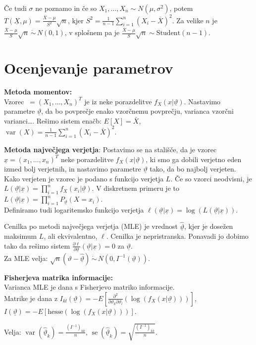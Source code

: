 \documentclass[11pt,a4paper]{amsart}
\theoremstyle{definition} %
\theoremstyle{plain} %
\newcommand{\X}{\underline{X}}
\newcommand{\ux}{\underline{x}}
\newcommand{\utheta}{\underline{\vartheta}}
\DeclareMathOperator{\var}{var}
\DeclareMathOperator{\se}{se}
\begin{document}
Če tudi $\sigma$ ne poznamo in če so $X_1,\ldots, X_n \sim N(\mu, \sigma^2)$,
potem $T(\X ,\mu) = \frac{\overline{X} - \mu}{S^2}\sqrt{n}$, kjer $S^2 =
\frac{1}{n-1} \sum_{i=1}^n (X_i - \overline{X})^2$. Za velike $n$ je $
\frac{\overline{X} - \mu}{S}\sqrt{n} \,\dot{\sim}\, N(0,1)$, v splošnem pa je $
\frac{\overline{X} - \mu}{S}\sqrt{n} \sim \text{Student}(n-1).$

\section*{Ocenjevanje parametrov}
\textbf{Metoda momentov:} \\
Vzorec $\ = (X_1, \dots, X_n)^T$ je iz neke porazdelitve $f_X(x|\utheta)$.
Nastavimo parametre $\utheta$, da bo povprečje enako vzorčnemu povprečju,
varianca vzorčni varianci\dots. Rešimo sistem enačb: $E[X] = \bar{X}$, $\var(X)
= \frac{1}{n-1}\sum_{i=1}^n (X_i - \bar{X})^2$.

\textbf{Metoda največjega verjetja}: Postavimo se na stališče, da je vzorec
$\ux = (x_1, \dots, x_n)^T$ neke porazdelitve
$f_X(x|\utheta)$, ki smo ga dobili verjetno eden izmed bolj verjetnih,
in nastavimo parametre $\utheta$ tako, da bo najbolj verjeten.
Kako verjeten je vzorec je podano s funkcijo verjetja $L$.
Če so vzorci neodvisni, je $L(\utheta|\ux) = \prod_{i=1}^n f_X(x_i|\utheta)$. V
diskretnem primeru je to $L(\utheta|\ux) = \prod_{i=1}^n P_{\utheta}(X=x_i)$. \\
Definiramo tudi logaritemsko funkcijo verjetja $\ell(\utheta|\ux) =
\log(L(\utheta|\ux))$.

Cenilka po metodi največjega verjetja (MLE) je vrednost $\hat{\utheta}$, kjer je
dosežen maksimum $L$, ali ekvivalentno, $\ell$. Cenilka je nepristranska.
Ponavadi jo dobimo tako da rešimo sistem $\frac{\partial \ell}{\partial
\utheta}(\utheta|\ux) = 0$ za $\utheta$. \\
Za MLE velja: $\sqrt{n}(\vartheta - \hat{\utheta}) \,\dot{\sim}\, N(0, I^{-1}(\utheta))$.

\textbf{Fisherjeva matrika informacije:} \\
Varianca MLE je dana s Fisherjevo matriko informacije. \\
Matrike je dana z $I_{kl}(\utheta) = -E\left[\frac{\partial^2}{\partial
\vartheta_k\partial\vartheta_l}(\log(f_X(x|\utheta)))\right]$, $I(\utheta) = -E[\text{hesse}(\log(f_X(x|\utheta)))]$.

Velja: $\var(\hat{\utheta}_k) = \frac{(I^{-1})_{kk}}{n}$, $\se(\hat{\utheta}_k) =
\sqrt{\frac{(I^{-1})_{kk}}{n}}$.
\end{document}
